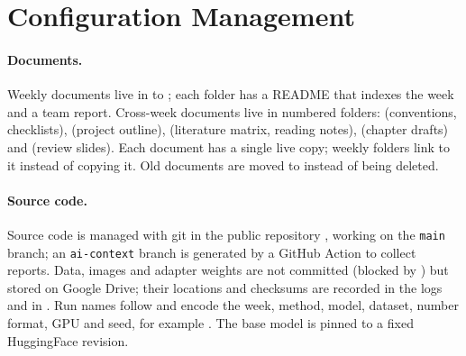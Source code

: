 \section{Configuration Management}

\paragraph{Documents.} Weekly documents live in  to
; each folder has a README that indexes the week and a team
report. Cross-week documents live in numbered folders: 
(conventions, checklists),  (project outline),
 (literature matrix, reading notes), 
(chapter drafts) and  (review slides). Each document has a
single live copy; weekly folders link to it instead of copying it. Old documents
are moved to  instead of being deleted.

\paragraph{Source code.} Source code is managed with git in the public
repository , working on the
\texttt{main} branch; an \texttt{ai-context} branch is generated by a GitHub
Action to collect reports. Data, images and adapter weights are not committed
(blocked by ) but stored on Google Drive; their locations and
checksums are recorded in the logs and in .
Run names follow  and encode the week,
method, model, dataset, number format, GPU and seed, for example
. The
base model is pinned to a fixed HuggingFace revision.

